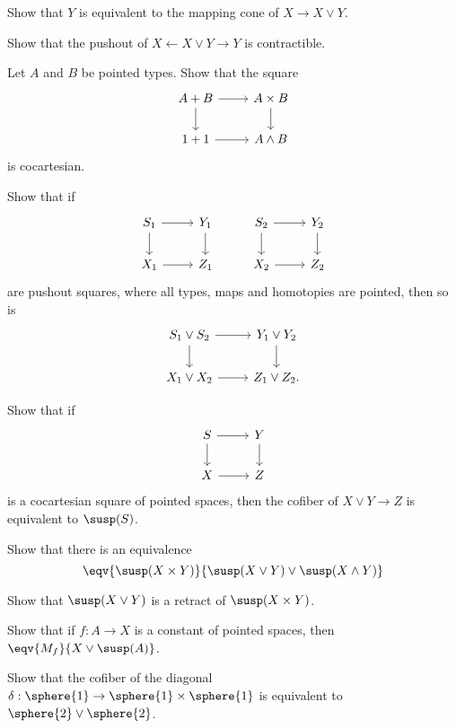 \begin{exercises}
\item 
\begin{subexenum}
\item Show that $Y$ is equivalent to the mapping cone of $X\to X\vee Y$.
\item Show that the pushout of $X \leftarrow X\vee Y \rightarrow Y$ is contractible.
\end{subexenum}
\item Let $A$ and $B$ be pointed types. Show that the square
\begin{equation*}
\begin{tikzcd}
A+B \arrow[r] \arrow[d] & A\times B \arrow[d] \\
1+1 \arrow[r] & A\wedge B
\end{tikzcd}
\end{equation*}
is cocartesian.
\item Show that if
\begin{equation*}
\begin{tikzcd}
S_1 \arrow[r] \arrow[d] & Y_1 \arrow[d] & S_2 \arrow[r] \arrow[d] & Y_2 \arrow[d] \\
X_1 \arrow[r] & Z_1 & X_2 \arrow[r] & Z_2
\end{tikzcd}
\end{equation*}
are pushout squares, where all types, maps and homotopies are pointed, then so is
\begin{equation*}
\begin{tikzcd}
S_1\vee S_2 \arrow[r] \arrow[d] & Y_1\vee Y_2 \arrow[d] \\
X_1 \vee X_2 \arrow[r] & Z_1\vee Z_2. 
\end{tikzcd}
\end{equation*}
\item Show that if
\begin{equation*}
\begin{tikzcd}
S \arrow[r] \arrow[d] & Y \arrow[d] \\
X \arrow[r] & Z
\end{tikzcd}
\end{equation*}
is a cocartesian square of pointed spaces, then the cofiber of $X\vee Y\to Z$ is equivalent to $\susp(S)$.
\item Show that there is an equivalence
\begin{equation*}
\eqv{\susp(X\times Y)}{\susp(X\vee Y)\vee \susp(X\wedge Y)}
\end{equation*}
\item Show that $\susp(X\vee Y)$ is a retract of $\susp(X\times Y)$. 
\item Show that if $f:A\to X$ is a constant of pointed spaces, then $\eqv{M_f}{X\vee \susp(A)}$. 
\item Show that the cofiber of the diagonal $\delta:\sphere{1}\to \sphere{1}\times\sphere{1}$ is equivalent to $\sphere{2}\vee\sphere{2}$.
\end{exercises}
